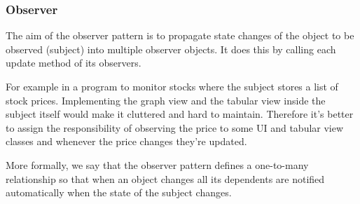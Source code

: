 \documentclass[a4paper]{article}
\begin{document}
\subsubsection{Observer}

The aim of the observer pattern is to propagate state changes of the object to be observed (subject) into multiple observer objects. It does this by calling each update method of its observers. 

For example in a program to monitor stocks where the subject stores a list of stock prices. Implementing the graph view and the tabular view inside the subject itself would make it cluttered and hard to maintain. Therefore it's better to assign the responsibility of observing the price to some UI and tabular view classes and whenever the price changes they're updated.

More formally, we say that the observer pattern defines a one-to-many relationship so that when an object changes all its dependents are notified automatically when the state of the subject changes.
\end{document}
